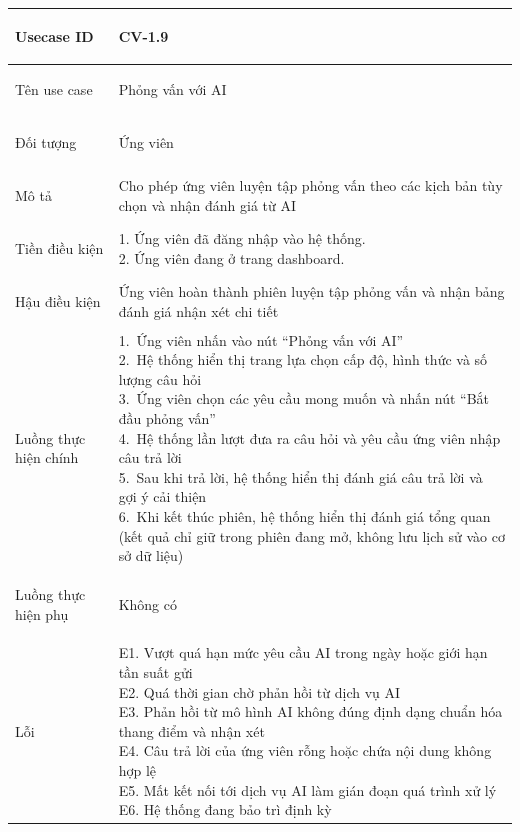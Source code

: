 \begin{table}[H]
    \centering
    \small
    \renewcommand{\arraystretch}{0.95}
    \begin{tabularx}{\textwidth}{|
        >{\bfseries\raggedright\arraybackslash}p{2.6cm}|Y|}
        \hline

        Usecase ID & CV-1.9 \\ \hline

        Tên use case & Phỏng vấn với AI \\ \hline

        Đối tượng & Ứng viên \\ \hline

        Mô tả & Cho phép ứng viên luyện tập phỏng vấn theo các kịch bản tùy chọn và nhận đánh giá từ AI \\ \hline

        Tiền điều kiện &
        \parbox[t]{\hsize}{
            1. Ứng viên đã đăng nhập vào hệ thống.\\
            2. Ứng viên đang ở trang dashboard.
        } \\
        \hline

        Hậu điều kiện & Ứng viên hoàn thành phiên luyện tập phỏng vấn và nhận bảng đánh giá nhận xét chi tiết \\ \hline

        Luồng thực hiện chính &
        \parbox[t]{\hsize}{
            1.\ Ứng viên nhấn vào nút ``Phỏng vấn với AI''\\
            2.\ Hệ thống hiển thị trang lựa chọn cấp độ, hình thức và số lượng câu hỏi\\
            3.\ Ứng viên chọn các yêu cầu mong muốn và nhấn nút ``Bắt đầu phỏng vấn''\\
            4.\ Hệ thống lần lượt đưa ra câu hỏi và yêu cầu ứng viên nhập câu trả lời\\
            5.\ Sau khi trả lời, hệ thống hiển thị đánh giá câu trả lời và gợi ý cải thiện\\
            6.\ Khi kết thúc phiên, hệ thống hiển thị đánh giá tổng quan (kết quả chỉ giữ trong phiên đang mở, không lưu lịch sử vào cơ sở dữ liệu)
        }\\
        \hline

        Luồng thực hiện phụ & Không có \\
        \hline

        Lỗi &
        \parbox[t]{\hsize}{
            E1. Vượt quá hạn mức yêu cầu AI trong ngày hoặc giới hạn tần suất gửi\\
            E2. Quá thời gian chờ phản hồi từ dịch vụ AI\\
            E3. Phản hồi từ mô hình AI không đúng định dạng chuẩn hóa thang điểm và nhận xét\\
            E4. Câu trả lời của ứng viên rỗng hoặc chứa nội dung không hợp lệ\\
            E5. Mất kết nối tới dịch vụ AI làm gián đoạn quá trình xử lý\\
            E6. Hệ thống đang bảo trì định kỳ
        }\\
        \hline


\end{tabularx}
\end{table}
